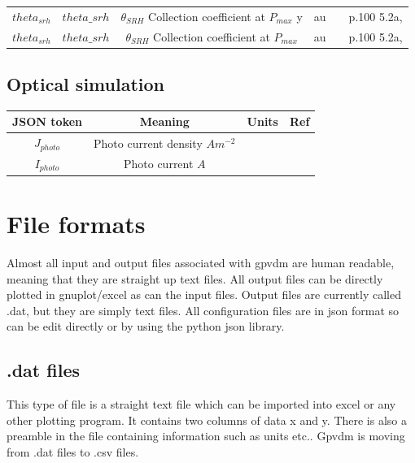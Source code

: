\begin{landscape}
\begin{center}
\begin{tabular}{ |c|c|c|c| c| c|}
$theta_{srh}$ 	&$theta\_{srh}$ & $\theta_{SRH}$ Collection coefficient at $P_{max}$ y & au &&p.100 5.2a\cite{Summon-FETCH-bonn_catalog_45326403},\cite{PhysRevApplied.6.024001}\\
$theta_{srh}$ 	&$theta\_{srh}$ & $\theta_{SRH}$ Collection coefficient at $P_{max}$ & au &&p.100 5.2a\cite{Summon-FETCH-bonn_catalog_45326403},\cite{PhysRevApplied.6.024001}\\


\hline
\end{tabular}

\end{center}

\end{landscape}

\subsection{Optical simulation}

\begin{center}
\begin{tabular}{ |c|c|c| c|} 
\hline
JSON token & Meaning & Units & Ref \\
\hline
$J_{photo}$ & Photo current density $Am^{-2}$& &\\
$I_{photo}$ & Photo current $A$& &\\


\hline
\end{tabular}
\end{center}


\section{File formats}
Almost all input and output files associated with gpvdm are human readable, meaning that they are straight up text files.  All output files can be directly plotted in gnuplot/excel as can the input files.  Output files are currently called .dat, but they are simply text files. All configuration files are in json format so can be edit directly or by using the python json library.

\subsection{.dat files}
This type of file is a straight text file which can be imported into excel or any other plotting program. It contains two columns of data x and y. There is also a preamble in the file containing information such as units etc..  Gpvdm is moving from .dat files to .csv files.

